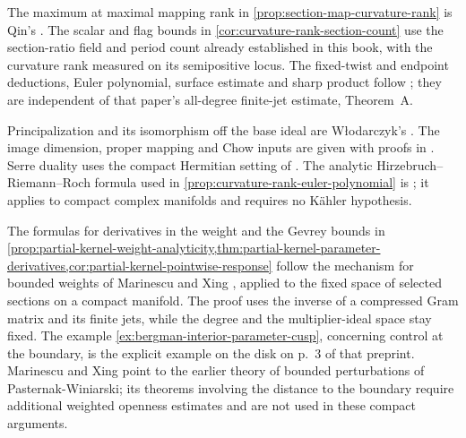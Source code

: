 The maximum at maximal mapping rank in \cref{prop:section-map-curvature-rank} is Qin's \cite[v1, Proposition~B.1, pp.~35--36]{QinCurvatureRank26}. The scalar and flag bounds in \cref{cor:curvature-rank-section-count} use the section-ratio field and period count already established in this book, with the curvature rank measured on its semipositive locus. The fixed-twist and endpoint deductions, Euler polynomial, surface estimate and sharp product follow \cite[v1, Sections~10.2--10.3 and Example~11.1, pp.~32--34]{QinCurvatureRank26}; they are independent of that paper's all-degree finite-jet estimate, Theorem~A.

Principalization and its isomorphism off the base ideal are W{\l}odarczyk's \cite[Theorem~2.0.3, p.~35, and Lemma~4.0.3, p.~42]{Wlo09}. The image dimension, proper mapping and Chow inputs are given with proofs in \cite[Chapter~II, Corollary~8.6, Theorem~8.8 and Theorem~8.10, pp.~118--121]{DemCADG}. Serre duality uses the compact Hermitian setting of \cite[Chapter~VI, Theorem~7.3, p.~310]{DemCADG}. The analytic Hirzebruch--Riemann--Roch formula used in \cref{prop:curvature-rank-euler-polynomial} is \cite[Theorem~(3.4), p.~163]{Ati64}; it applies to compact complex manifolds and requires no K\"ahler hypothesis.

The formulas for derivatives in the weight and the Gevrey bounds in \cref{prop:partial-kernel-weight-analyticity,thm:partial-kernel-parameter-derivatives,cor:partial-kernel-pointwise-response} follow the mechanism for bounded weights of Marinescu and Xing \cite[v1, Theorems~1.1--1.2, pp.~2--3, and Section~3, pp.~11--19]{MarinescuXingParameter26}, applied to the fixed space of selected sections on a compact manifold. The proof uses the inverse of a compressed Gram matrix and its finite jets, while the degree and the multiplier-ideal space stay fixed. The example \cref{ex:bergman-interior-parameter-cusp}, concerning control at the boundary, is the explicit example on the disk on p.~3 of that preprint. Marinescu and Xing point to the earlier theory of bounded perturbations of Pasternak-Winiarski; its theorems involving the distance to the boundary require additional weighted openness estimates and are not used in these compact arguments.

